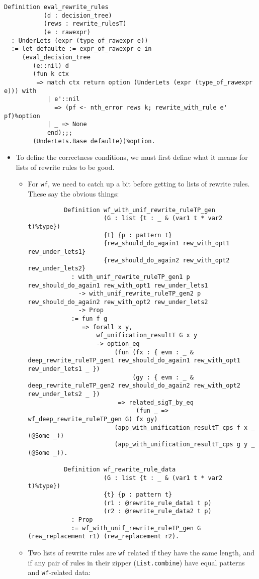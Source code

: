 \documentclass[
]{article}
\providecommand{\tightlist}{%
  \setlength{\itemsep}{0pt}\setlength{\parskip}{0pt}}
\begin{document}
\begin{itemize}
\begin{verbatim}
Definition eval_rewrite_rules
           (d : decision_tree)
           (rews : rewrite_rulesT)
           (e : rawexpr)
  : UnderLets (expr (type_of_rawexpr e))
  := let defaulte := expr_of_rawexpr e in
     (eval_decision_tree
        (e::nil) d
        (fun k ctx
         => match ctx return option (UnderLets (expr (type_of_rawexpr e))) with
            | e'::nil
              => (pf <- nth_error rews k; rewrite_with_rule e' pf)%option
            | _ => None
            end);;;
        (UnderLets.Base defaulte))%option.
\end{verbatim}

  \begin{itemize}
  \tightlist
  \item
    To define the correctness conditions, we must first define what it
    means for lists of rewrite rules to be good.

    \begin{itemize}
    \item
      For \texttt{wf}, we need to catch up a bit before getting to lists
      of rewrite rules. These say the obvious things:

\begin{verbatim}
          Definition wf_with_unif_rewrite_ruleTP_gen
                     (G : list {t : _ & (var1 t * var2 t)%type})
                     {t} {p : pattern t}
                     {rew_should_do_again1 rew_with_opt1 rew_under_lets1}
                     {rew_should_do_again2 rew_with_opt2 rew_under_lets2}
            : with_unif_rewrite_ruleTP_gen1 p rew_should_do_again1 rew_with_opt1 rew_under_lets1
              -> with_unif_rewrite_ruleTP_gen2 p rew_should_do_again2 rew_with_opt2 rew_under_lets2
              -> Prop
            := fun f g
               => forall x y,
                   wf_unification_resultT G x y
                   -> option_eq
                        (fun (fx : { evm : _ & deep_rewrite_ruleTP_gen1 rew_should_do_again1 rew_with_opt1 rew_under_lets1 _ })
                             (gy : { evm : _ & deep_rewrite_ruleTP_gen2 rew_should_do_again2 rew_with_opt2 rew_under_lets2 _ })
                         => related_sigT_by_eq
                              (fun _ => wf_deep_rewrite_ruleTP_gen G) fx gy)
                        (app_with_unification_resultT_cps f x _ (@Some _))
                        (app_with_unification_resultT_cps g y _ (@Some _)).

          Definition wf_rewrite_rule_data
                     (G : list {t : _ & (var1 t * var2 t)%type})
                     {t} {p : pattern t}
                     (r1 : @rewrite_rule_data1 t p)
                     (r2 : @rewrite_rule_data2 t p)
            : Prop
            := wf_with_unif_rewrite_ruleTP_gen G (rew_replacement r1) (rew_replacement r2).
\end{verbatim}
    \item
      Two lists of rewrite rules are \texttt{wf} related if they have
      the same length, and if any pair of rules in their zipper
      (\texttt{List.combine}) have equal patterns and
      \texttt{wf}-related data:


\end{itemize}
\end{itemize}
\end{itemize}
\end{document}
